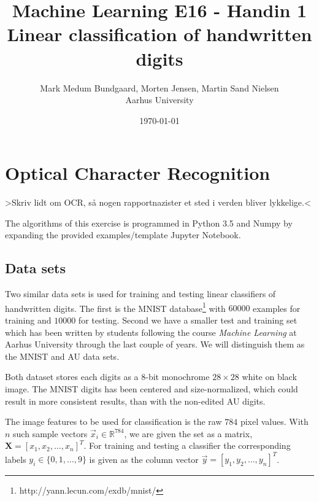 \documentclass[a4paper,10pt,article,oneside,english]{memoir}
\begin{document}
	\title{Machine Learning E16 - Handin 1\\Linear classification of handwritten digits}
	\author{Mark Medum Bundgaard, Morten Jensen, Martin Sand Nielsen\\ Aarhus University}
	\date{\today}
	
	\mainmatter
	\maketitle



\chapter{Optical Character Recognition}
>Skriv lidt om OCR, så nogen rapportnazister et sted i verden bliver lykkelige.<

The algorithms of this exercise is programmed in Python 3.5 and Numpy by expanding the provided examples/template Jupyter Notebook.

\section{Data sets}
Two similar data sets is used for training and testing linear classifiers of handwritten digits. The first is the MNIST database\footnote{http://yann.lecun.com/exdb/mnist/} with $60000$ examples for training and $10000$ for testing. Second we have a smaller test and training set which has been written by students following the course \emph{Machine Learning} at Aarhus University through the last couple of years. We will distinguish them as the MNIST and AU data sets.


Both dataset stores each digits as a 8-bit monochrome $28\times28$ white on black image. The MNIST digits has been centered and size-normalized, which could result in more consistent results, than with the non-edited AU digits. 

The image features to be used for classification is the raw $784$ pixel values. With $n$ such sample vectors $\vec{x}_i\in \mathbb{R}^{784}$, we are given the set as a matrix, $\mathbf{X} = [x_1, x_2, \dots, x_n]^T$. For training and testing a classifier the corresponding labels $y_i \in \{0,1,\dots,9\}$ is given as the column vector $\vec{y} = [y_1, y_2, \dots, y_n]^T$. 
\end{document}

